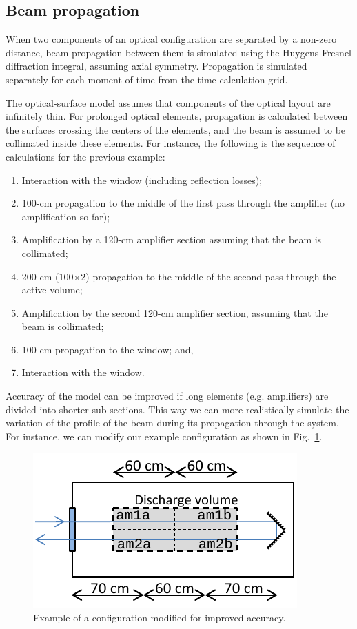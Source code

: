 \documentclass{report}
\begin{document}
\subsection{Beam propagation}
When two components of an optical configuration are separated by a non-zero distance, beam propagation between them is simulated using the Huygens-Fresnel diffraction integral, assuming axial symmetry. Propagation is simulated separately for each moment of time from the time calculation grid.

The optical-surface model assumes that components of the optical layout are infinitely thin. For prolonged optical elements, propagation is calculated between the surfaces crossing the centers of the elements, and the beam is assumed to be collimated inside these elements. For instance, the following is the sequence of calculations for the previous example:

\begin{enumerate}
\item Interaction with the window (including reflection losses);
\item 100-cm propagation to the middle of the first pass through the amplifier (no amplification so far);
\item Amplification by a 120-cm amplifier section assuming that the beam is collimated;
\item 200-cm (100$\times$2) propagation to the middle of the second pass through the active volume;
\item Amplification by the second 120-cm amplifier section, assuming that the beam is collimated;
\item 100-cm propagation to the window; and,
\item Interaction with the window.
\end{enumerate}

Accuracy of the model can be improved if long elements (e.g. amplifiers) are divided into shorter sub-sections. This way we can more realistically simulate the variation of the profile of the beam during its propagation through the system. For instance, we can modify our example configuration as shown in Fig.~\ref{fig:optical-configuration-2}.

\begin{figure}[ht]
\centering
\includegraphics{images/optical-configuration-2}
\caption{Example of a configuration modified for improved accuracy.}\label{fig:optical-configuration-2}
\end{figure}
 
\end{document}
